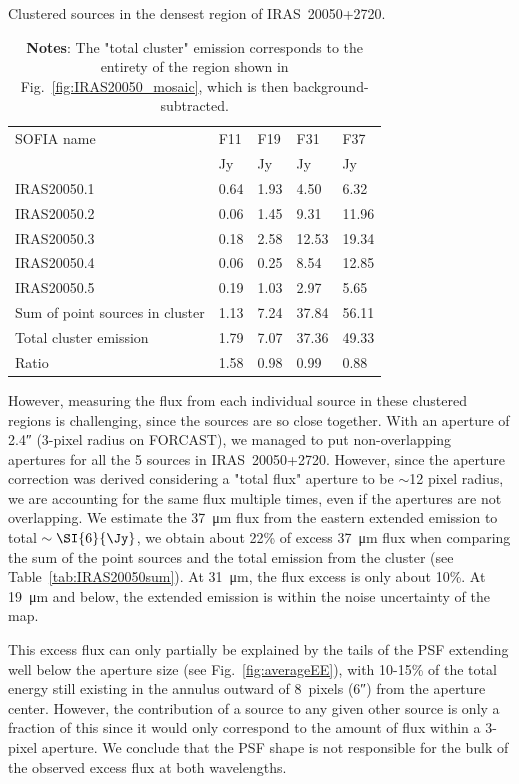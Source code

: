 \renewcommand{\arraystretch}{1.5}
\begin{table}[!h]
\scriptsize
\caption[Clustered sources in IRAS~20050+2720's dense core]{Clustered sources in the densest region of IRAS~20050+2720.}
\label{tab:IRAS20050sum}
\vspace{-0.5cm}
\begin{longtable}{lP{2cm}P{2cm}P{2cm}P{2cm}}
\toprule																			
SOFIA name	&	F11	&	F19	&	F31	&	F37	\\
	&	Jy	&	Jy	&	Jy	&	Jy\\
\midrule									
IRAS20050.1	&	0.64	&	1.93	&	4.50	&	6.32	\\
IRAS20050.2	&	0.06	&	1.45	&	9.31	&	11.96	\\
IRAS20050.3	&	0.18	&	2.58	&	12.53	&	19.34	\\
IRAS20050.4	&	0.06	&	0.25	&	8.54	&	12.85	\\
IRAS20050.5	&	0.19	&	1.03	&	2.97	&	5.65	\\
\midrule									
Sum of point sources in cluster	&	1.13	&	7.24	&	37.84	&	56.11	\\
Total cluster emission	&	1.79	&	7.07	&	37.36	&	49.33	\\
Ratio	&	1.58	&	0.98	&	0.99	&	0.88	\\
\bottomrule					
	\end{longtable} 
	\caption*{\textbf{Notes}: The "total cluster" emission corresponds to the entirety of the region shown in Fig.~\ref{fig:IRAS20050_mosaic}, which is then background-subtracted.}
\end{table}

However, measuring the flux from each individual source in these clustered regions is challenging, since the sources are so close together. With an aperture of \ang{;;2.4} (3-pixel radius on FORCAST), we managed to put non-overlapping apertures for all the 5 sources in IRAS~20050+2720. However, since the aperture correction was derived considering a "total flux" aperture to be $\sim$12 pixel radius, we are accounting for the same flux multiple times, even if the apertures are not overlapping. We estimate the \SI{37}{\um} flux from the eastern extended emission to total $\sim\SI{6}{\Jy}$, we obtain about 22\% of excess \SI{37}{\um} flux when comparing the sum of the point sources and the total emission from the cluster (see Table~\ref{tab:IRAS20050sum}). At \SI{31}{\um}, the flux excess is only about 10\%. At \SI{19}{\um} and below, the extended emission is within the noise uncertainty of the map. 

This excess flux can only partially be explained by the tails of the PSF extending well below the aperture size (see Fig.~\ref{fig:averageEE}), with 10-15\% of the total energy still existing in the annulus outward of 8~pixels (\ang{;;6}) from the aperture center. However, the contribution of a source to any given other source is only a fraction of this since it would only correspond to the amount of flux within a 3-pixel aperture. We conclude that the PSF shape is not responsible for the bulk of the observed excess flux at both wavelengths.

